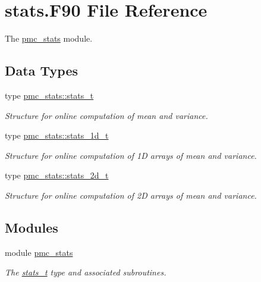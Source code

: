 \hypertarget{stats_8_f90}{}\section{stats.\+F90 File Reference}
\label{stats_8_f90}


The \mbox{\hyperlink{namespacepmc__stats}{pmc\+\_\+stats}} module.  


\subsection*{Data Types}
\begin{DoxyCompactItemize}
\item 
type \mbox{\hyperlink{structpmc__stats_1_1stats__t}{pmc\+\_\+stats\+::stats\+\_\+t}}
\begin{DoxyCompactList}\small\item\em Structure for online computation of mean and variance. \end{DoxyCompactList}\item 
type \mbox{\hyperlink{structpmc__stats_1_1stats__1d__t}{pmc\+\_\+stats\+::stats\+\_\+1d\+\_\+t}}
\begin{DoxyCompactList}\small\item\em Structure for online computation of 1D arrays of mean and variance. \end{DoxyCompactList}\item 
type \mbox{\hyperlink{structpmc__stats_1_1stats__2d__t}{pmc\+\_\+stats\+::stats\+\_\+2d\+\_\+t}}
\begin{DoxyCompactList}\small\item\em Structure for online computation of 2D arrays of mean and variance. \end{DoxyCompactList}\end{DoxyCompactItemize}
\subsection*{Modules}
\begin{DoxyCompactItemize}
\item 
module \mbox{\hyperlink{namespacepmc__stats}{pmc\+\_\+stats}}
\begin{DoxyCompactList}\small\item\em The {\ttfamily \mbox{\hyperlink{structpmc__stats_1_1stats__t}{stats\+\_\+t}}} type and associated subroutines. \end{DoxyCompactList}\end{DoxyCompactItemize}
